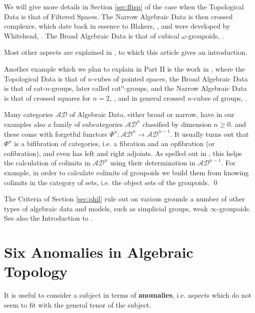\documentclass{elsarticle}
\def\AD{\mathcal{AD}}
\begin{document}
We will give more details in Section \ref{sec:fltsp} of the case when the Topological Data is that of
Filtered Spaces.  The Narrow Algebraic Data is then crossed complexes, which date back in
essence to Blakers, \cite{Bl48}, and were developed by Whitehead,  \cite{W49CHII}. The Broad Algebraic Data
is that of cubical $\omega$-groupoids, \cite{BH81algcub}.


Most other aspects are explained in  \cite{BHS},
to which this article gives an introduction.



Another example which we plan to explain  in Part II is the work in \cite{BL87,BL2},
where the Topological Data is that of $n$-cubes of pointed spaces, the Broad Algebraic Data
is that of cat-$n$-groups, later called cat$^n$-groups, and the Narrow Algebraic Data is that of crossed squares for $n=2$,  \cite[Section 5]{Lod82}, and in general crossed  $n$-cubes of groups, \cite{ESt}.
\begin{remark}\label{rem:induct}
  Many  categories  $\AD$ of Algebraic Data, either broad or narrow, have in our examples also a family of subcategories $\AD^n$ classified by dimension $n \geqslant 0$. and these come with forgetful functors $\Phi^n : \AD^n \to \AD ^{n-1}$. It usually turns out that $\Phi^n$ is a bifibration of categories, i.e. a fibration and an opfibration (or cofibration), and even has left and right adjoints. As spelled out in \cite[Appendix B]{BHS}, this helps the calculation of colimits in $\AD^n$ using their determination in $\AD^{n-1}$. For example, in order to calculate colimits of groupoids we build them from knowing colimits in the category of sets, i.e. the object sets of the groupoids. \qed
\end{remark}



The  Criteria of Section \ref{sec:phil} rule out on various grounds a number of other types of algebraic data
and models, such as simplicial groups, weak $\infty$-groupoids. See also the Introduction to \cite{Ellis-3-type}.

 \section{Six Anomalies in Algebraic Topology}\label{sec:anomal}
 It is useful to consider a subject in terms of {\bf anomalies}, i.e. aspects which do not seem to fit with the general tenor of the subject.
\end{document}
